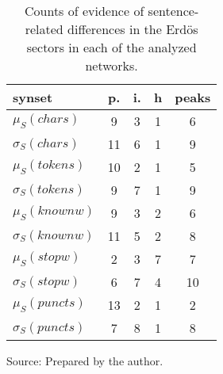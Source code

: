 \begin{table}[h!]
\begin{center}
\caption{Counts of evidence of sentence-related differences in the Erd\"os sectors in each of the analyzed networks.}
	\def\arraystretch{1.5}
\begin{tabular}{| l || c | c | c || c |}\hline
{\bf synset} & {\bf p.} & {\bf i.} & {\bf h} & {\bf peaks} \\\hline\hline
$\mu_S(chars)$ & 9  & 3  & 1  & 6 \\
$\sigma_S(chars)$ & 11  & 6  & 1  & 9 \\\hline
$\mu_S(tokens)$ & 10  & 2  & 1  & 5 \\
$\sigma_S(tokens)$ & 9  & 7  & 1  & 9 \\\hline
$\mu_S(knownw)$ & 9  & 3  & 2  & 6 \\
$\sigma_S(knownw)$ & 11  & 5  & 2  & 8 \\\hline
$\mu_S(stopw)$ & 2  & 3  & 7  & 7 \\
$\sigma_S(stopw)$ & 6  & 7  & 4  & 10 \\\hline
$\mu_S(puncts)$ & 13  & 2  & 1  & 2 \\
$\sigma_S(puncts)$ & 7  & 8  & 1  & 8 \\\hline
\end{tabular}
\begin{flushleft}
		Source: Prepared by the author.\
\end{flushleft}
\end{center}
\end{table}
